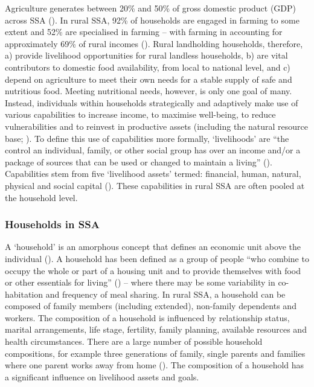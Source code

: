 Agriculture generates between 20\% and 50\% of gross domestic product (GDP) across SSA (\citealp{Proctor2014}). In rural SSA, 92\% of households are engaged in farming to some extent and 52\% are specialised in farming -- with farming in accounting for approximately 69\% of rural incomes (\citealp{Davis2017}). Rural landholding households, therefore, a) provide livelihood opportunities for rural landless households, b) are vital contributors to domestic food availability, from local to national level, and c) depend on agriculture to meet their own needs for a stable supply of safe and nutritious food. Meeting nutritional needs, however, is only one goal of many. Instead, individuals within households strategically and adaptively make use of various capabilities to increase income, to maximise well-being, to reduce vulnerabilities and to reinvest in productive assets (including the natural resource base; \citealp{Ashley1999, Farrington1999, Scoones1998}). To define this use of capabilities more formally, `livelihoods' are ``the control an individual, family, or other social group has over an income and/or a package of sources that can be used or changed to maintain a living'' (\citealp[p.~9]{Blaikie1994}). Capabilities stem from five `livelihood assets' termed: financial, human, natural, physical and social capital (\citealp{Farrington1999}). These capabilities in rural SSA are often pooled at the household level.


\subsubsection{Households in SSA}

A `household' is an amorphous concept that defines an economic unit above the individual (\citealp{Randall2015}). A household has been defined as a group of people ``who combine to occupy the whole or part of a housing unit and to provide themselves with food or other essentials for living'' (\citealp[p.~74]{UnitedNations1959}) -- where there may be some variability in co-habitation and frequency of meal sharing. In rural SSA, a household can be composed of family members (including extended), non-family dependents and workers. The composition of a household is influenced by relationship status, marital arrangements, life stage, fertility, family planning, available resources and health circumstances. There are a large number of possible household compositions, for example three generations of family, single parents and families where one parent works away from home (\citealp{Randall2015}). The composition of a household has a significant influence on livelihood assets and goals.

